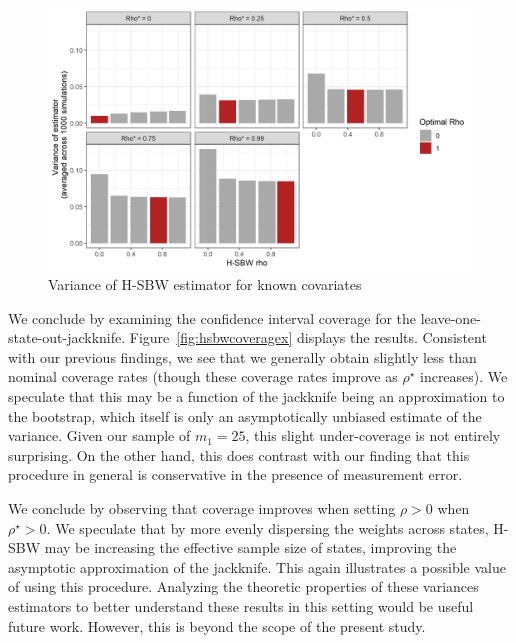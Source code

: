 \begin{figure}[H]
\begin{center}
    \caption{Variance of H-SBW estimator for known covariates}\label{fig:hsbwvarx}
    \includegraphics[scale=0.5]{01_Plots/variance-x-plot.png}
\end{center}
\end{figure}

We conclude by examining the confidence interval coverage for the leave-one-state-out-jackknife. Figure~\ref{fig:hsbwcoveragex} displays the results. Consistent with our previous findings, we see that we generally obtain slightly less than nominal coverage rates (though these coverage rates improve as $\rho^\star$ increases). We speculate that this may be a function of the jackknife being an approximation to the bootstrap, which itself is only an asymptotically unbiased estimate of the variance. Given our sample of $m_1 = 25$, this slight under-coverage is not entirely surprising. On the other hand, this does contrast with our finding that this procedure in general is conservative in the presence of measurement error. 

We conclude by observing that coverage improves when setting $\rho > 0$ when $\rho^\star > 0$. We speculate that by more evenly dispersing the weights across states, H-SBW may be increasing the effective sample size of states, improving the asymptotic approximation of the jackknife. This again illustrates a possible value of using this procedure. Analyzing the theoretic properties of these variances estimators to better understand these results in this setting would be useful future work. However, this is beyond the scope of the present study.

